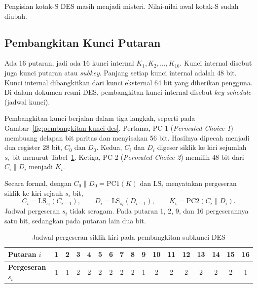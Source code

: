 Pengisian kotak-S DES masih menjadi misteri. Nilai-nilai awal kotak-S sudah
diubah.

\subsection{Pembangkitan Kunci Putaran}

Ada 16 putaran, jadi ada 16 kunci internal $K_1, K_2, \dots, K_{16}$. Kunci
internal disebut juga kunci putaran atau \textit{subkey}. Panjang setiap kunci
internal adalah 48 bit. Kunci internal dibangkitkan dari kunci eksternal
64 bit yang diberikan pengguna. Di dalam dokumen resmi DES, pembangkitan kunci
internal disebut \textit{key schedule} (jadwal kunci).

Pembangkitan kunci berjalan dalam tiga langkah, seperti pada
Gambar~\ref{fig:pembangkitan-kunci-des}. Pertama, PC-1
(\textit{Permuted Choice 1}) membuang delapan bit paritas dan menyisakan
56 bit. Hasilnya dipecah menjadi dua register 28 bit, $C_0$ dan $D_0$. Kedua,
$C_i$ dan $D_i$ digeser siklik ke kiri sejumlah $s_i$ bit menurut
Tabel~\ref{tab:jadwal-geser-des}. Ketiga, PC-2 (\textit{Permuted Choice 2})
memilih 48 bit dari $C_i \parallel D_i$ menjadi $K_i$.

Secara formal, dengan $C_0 \parallel D_0 = \mathrm{PC1}(K)$ dan
$\mathrm{LS}_i$ menyatakan pergeseran siklik ke kiri sejauh $s_i$ bit,
\begin{equation}
C_i = \mathrm{LS}_{s_i}(C_{i-1}), \qquad D_i = \mathrm{LS}_{s_i}(D_{i-1}),
\qquad K_i = \mathrm{PC2}(C_i \parallel D_i).
\label{eq:des-subkunci}
\end{equation}
Jadwal pergeseran $s_i$ tidak seragam. Pada putaran 1, 2, 9, dan 16
pergeserannya satu bit, sedangkan pada putaran lain dua bit.

\begin{table}[htbp]
\centering
\small
\setlength{\tabcolsep}{4pt}
\begin{tabular}{@{}l*{16}{c}@{}}
\hline
\textbf{Putaran $i$} & 1 & 2 & 3 & 4 & 5 & 6 & 7 & 8 & 9 & 10 & 11 & 12 & 13 & 14 & 15 & 16 \\
\hline
\textbf{Pergeseran $s_i$} & 1 & 1 & 2 & 2 & 2 & 2 & 2 & 2 & 1 & 2 & 2 & 2 & 2 & 2 & 2 & 1 \\
\hline
\end{tabular}
\caption{Jadwal pergeseran siklik kiri pada pembangkitan subkunci DES}
\label{tab:jadwal-geser-des}
\end{table}

